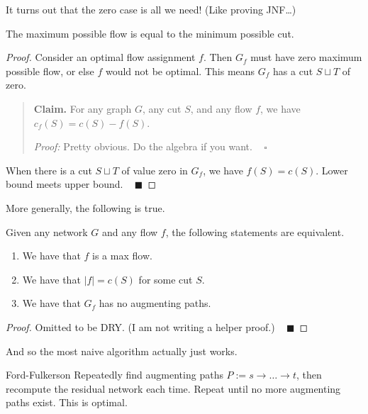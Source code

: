 It turns out that the zero case is all we need!  (Like proving JNF\dots)

\begin{claim}
    The maximum possible flow is equal to the minimum possible cut.
\end{claim}

\begin{proof}
    Consider an optimal flow assignment $f$.  Then $G_f$ must have zero maximum possible flow, or else $f$ would not be optimal.  This means $G_f$ has a cut $S \sqcup T$ of zero.

    \begin{quote}
        \textbf{Claim.} For any graph $G$, any cut $S$, and any flow $f$, we have $c_f(S) = c(S) - f(S)$.

        \emph{Proof:} Pretty obvious.  Do the algebra if you want. ~ $\square$
    \end{quote}    
    When there is a cut $S \sqcup T$ of value zero in $G_f$, we have $f(S) = c(S)$.  Lower bound meets upper bound. ~ $\blacksquare$
\end{proof}

More generally, the following is true.

\begin{claim}
    Given any network $G$ and any flow $f$, the following statements are equivalent.
    \begin{enumerate}
        \item We have that $f$ is a max flow.
        \item We have that $|f| = c(S)$ for some cut $S$.
        \item We have that $G_f$ has no augmenting paths.
    \end{enumerate}
\end{claim}

\begin{proof}
    Omitted to be DRY.  (I am not writing a helper proof.) ~ $\blacksquare$
\end{proof}

And so the most naive algorithm actually just works.

\begin{solution}{Ford-Fulkerson}
    Repeatedly find augmenting paths $P := s \to \dots \to t$, then recompute the residual network each time.  Repeat until no more augmenting paths exist.  This is optimal.
\end{solution}

